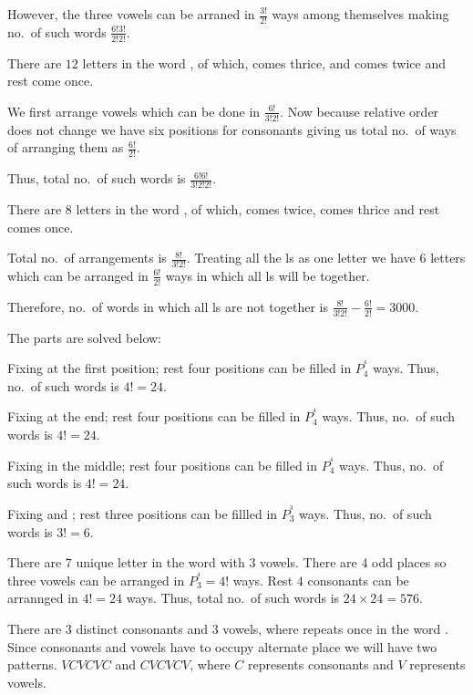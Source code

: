   However, the three vowels can be arraned in $\frac{3!}{2!}$ ways among themselves making no.\ of such words
  $\frac{6!3!}{2!2!}$.
\item There are $12$ letters in the word , of which,  comes thrice,
   and  comes twice and rest come once.

  We first arrange vowels which can be done in $\frac{6!}{3!2!}$. Now because relative order does not change
  we have six positions for consonants giving us total no.\ of ways of arranging them as $\frac{6!}{2!}$.

  Thus, total no.\ of such words is $\frac{6!6!}{3!2!2!}$.
\item There are $8$ letters in the word , of which,  comes twice, 
  comes thrice and rest comes once.

  Total no.\ of arrangements is $\frac{8!}{3!2!}$. Treating all the ls as one letter we have $6$ letters
  which can be arranged in $\frac{6!}{2!}$ ways in which all ls will be together.

  Therefore, no.\ of words in which all ls are not together is $\frac{8!}{3!2!} - \frac{6!}{2!} = 3000$.
\item The parts are solved below:
  \startitemize[i]
  \item Fixing  at the first position; rest four positions can be filled in $P_4^^4$ ways. Thus,
    no.\ of such words is $4! = 24$.
  \item Fixing  at the end; rest four positions can be filled in $P_4^^4$ ways. Thus,
    no.\ of such words is $4! = 24$.
  \item Fixing  in the middle; rest four positions can be filled in $P_4^^4$ ways. Thus,
    no.\ of such words is $4! = 24$.
  \item Fixing  and ; rest three positions can be fillled in $P_3^^3$ ways. Thus, no.\ of
    such words is $3! = 6$.
  \stopitemize
\item There are $7$ unique letter in the word  with $3$ vowels. There are $4$ odd places
  so three vowels can be arranged in $P_3^^4 = 4!$ ways. Rest $4$ consonants can be arrannged in $4! = 24$
  ways. Thus, total no.\ of such words is $24\times 24 = 576$.
\item There are $3$ distinct consonants and $3$ vowels, where  repeats once in the word
  . Since consonants and vowels have to occupy alternate place we will have two
  patterns. $VCVCVC$ and $CVCVCV$, where $C$ represents consonants and $V$ represents vowels.

